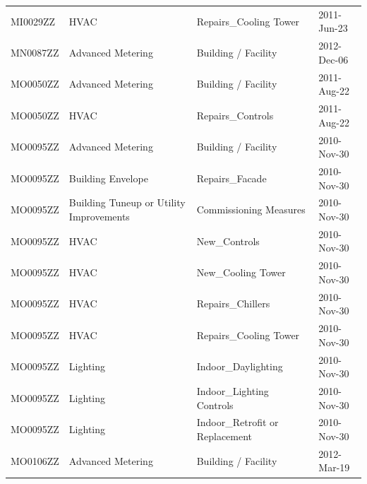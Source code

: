 \documentclass[12pt]{article}
\begin{document}
\begin{longtable}{lp{4cm}p{4cm}p{3cm}}
MI0029ZZ         & HVAC                                    & Repairs\_Cooling Tower                    & 2011-Jun-23                   \\
MN0087ZZ         & Advanced Metering                       & Building / Facility                       & 2012-Dec-06                   \\
MO0050ZZ         & Advanced Metering                       & Building / Facility                       & 2011-Aug-22                   \\
MO0050ZZ         & HVAC                                    & Repairs\_Controls                         & 2011-Aug-22                   \\
MO0095ZZ         & Advanced Metering                       & Building / Facility                       & 2010-Nov-30                   \\
MO0095ZZ         & Building Envelope                       & Repairs\_Facade                           & 2010-Nov-30                   \\
MO0095ZZ         & Building Tuneup or Utility Improvements & Commissioning Measures                    & 2010-Nov-30                   \\
MO0095ZZ         & HVAC                                    & New\_Controls                             & 2010-Nov-30                   \\
MO0095ZZ         & HVAC                                    & New\_Cooling Tower                        & 2010-Nov-30                   \\
MO0095ZZ         & HVAC                                    & Repairs\_Chillers                         & 2010-Nov-30                   \\
MO0095ZZ         & HVAC                                    & Repairs\_Cooling Tower                    & 2010-Nov-30                   \\
MO0095ZZ         & Lighting                                & Indoor\_Daylighting                       & 2010-Nov-30                   \\
MO0095ZZ         & Lighting                                & Indoor\_Lighting Controls                 & 2010-Nov-30                   \\
MO0095ZZ         & Lighting                                & Indoor\_Retrofit or Replacement           & 2010-Nov-30                   \\
MO0106ZZ         & Advanced Metering                       & Building / Facility                       & 2012-Mar-19                   \\

\end{longtable}
\end{document}
